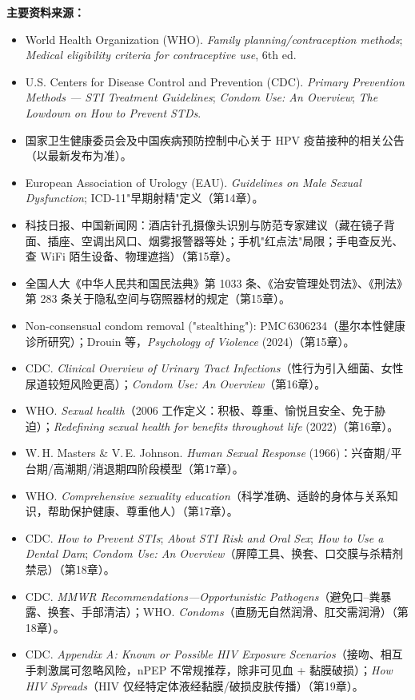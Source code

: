 \documentclass[12pt,UTF8,openany]{ctexbook}
\begin{document}
\noindent\textbf{主要资料来源：}
\begin{itemize}[leftmargin=2em]
  \item World Health Organization (WHO). \emph{Family planning/contraception methods}; \emph{Medical eligibility criteria for contraceptive use}, 6th ed.
  \item U.S. Centers for Disease Control and Prevention (CDC). \emph{Primary Prevention Methods — STI Treatment Guidelines}; \emph{Condom Use: An Overview}; \emph{The Lowdown on How to Prevent STDs}.
  \item 国家卫生健康委员会及中国疾病预防控制中心关于 HPV 疫苗接种的相关公告（以最新发布为准）。
  \item European Association of Urology (EAU). \emph{Guidelines on Male Sexual Dysfunction}; ICD-11"早期射精"定义（第14章）。
  \item 科技日报、中国新闻网：酒店针孔摄像头识别与防范专家建议（藏在镜子背面、插座、空调出风口、烟雾报警器等处；手机"红点法"局限；手电查反光、查 WiFi 陌生设备、物理遮挡）（第15章）。
  \item 全国人大《中华人民共和国民法典》第 1033 条、《治安管理处罚法》、《刑法》第 283 条关于隐私空间与窃照器材的规定（第15章）。
  \item Non-consensual condom removal ("stealthing"): PMC\,6306234（墨尔本性健康诊所研究）；Drouin 等，\emph{Psychology of Violence} (2024)（第15章）。
  \item CDC. \emph{Clinical Overview of Urinary Tract Infections}（性行为引入细菌、女性尿道较短风险更高）；\emph{Condom Use: An Overview}（第16章）。
  \item WHO. \emph{Sexual health}（2006 工作定义：积极、尊重、愉悦且安全、免于胁迫）；\emph{Redefining sexual health for benefits throughout life} (2022)（第16章）。
  \item W.\,H. Masters \& V.\,E. Johnson. \emph{Human Sexual Response} (1966)：兴奋期/平台期/高潮期/消退期四阶段模型（第17章）。
  \item WHO. \emph{Comprehensive sexuality education}（科学准确、适龄的身体与关系知识，帮助保护健康、尊重他人）（第17章）。
  \item CDC. \emph{How to Prevent STIs}; \emph{About STI Risk and Oral Sex}; \emph{How to Use a Dental Dam}; \emph{Condom Use: An Overview}（屏障工具、换套、口交膜与杀精剂禁忌）（第18章）。
  \item CDC. \emph{MMWR Recommendations—Opportunistic Pathogens}（避免口--粪暴露、换套、手部清洁）；WHO. \emph{Condoms}（直肠无自然润滑、肛交需润滑）（第18章）。
  \item CDC. \emph{Appendix A: Known or Possible HIV Exposure Scenarios}（接吻、相互手刺激属可忽略风险，nPEP 不常规推荐，除非可见血 + 黏膜破损）；\emph{How HIV Spreads}（HIV 仅经特定体液经黏膜/破损皮肤传播）（第19章）。

\end{itemize}
\end{document}
